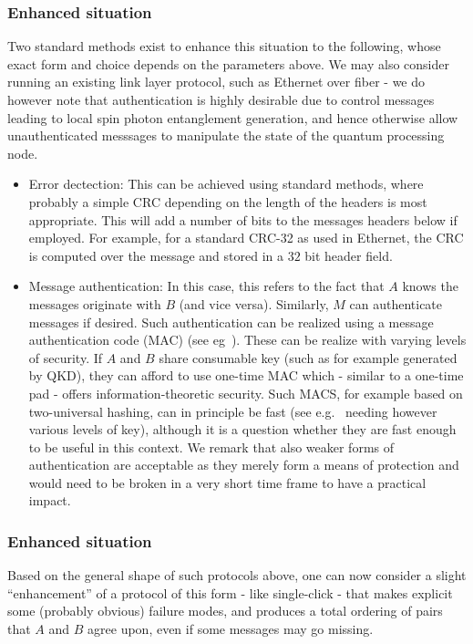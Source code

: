 \documentclass{article}
\begin{document}
\subsubsection{Enhanced situation}
Two standard methods exist to enhance this situation to the following, whose exact form and choice depends on the parameters above. We may also 
consider running an existing link layer protocol, such as Ethernet over fiber - we do however note that authentication is highly desirable due
to control messages leading to local spin photon entanglement generation, and hence otherwise allow unauthenticated messsages to manipulate the 
state of the quantum processing node.
\begin{itemize}
\item Error dectection: This can be achieved using standard methods, where probably a simple CRC depending on the length of the headers is most appropriate. This will add a number of bits to the messages headers below if employed. For example, for a standard CRC-32 as used in Ethernet, the CRC is computed over the message and stored in a $32$ bit header field.
\item Message authentication: In this case, this refers to the fact that $A$ knows the messages originate with $B$ (and vice versa). 
Similarly, $M$ can authenticate messages if desired. Such authentication can be realized using a message authentication code (MAC) (see eg~\cite{UMAC}). These can be realize with varying levels of security. If $A$ and $B$ share consumable key (such as for example generated by QKD), they can afford to use one-time MAC which - similar to a one-time pad - offers information-theoretic security. Such MACS, for example based on two-universal hashing,  can in principle be fast (see e.g.~\cite{UMAC} needing however various levels of key), although it is a question whether they are fast enough to be useful in this context. We remark that also weaker forms of authentication are acceptable as they merely form a means of protection and would need to be broken in a very short time frame to have a practical impact.
\end{itemize}

\subsubsection{Enhanced situation}

Based on the general shape of such protocols above, one can now consider a slight ``enhancement'' of a protocol of this form - like single-click - 
that makes explicit some (probably obvious) failure modes, and produces a total ordering of pairs that $A$ and $B$ agree upon, even if some messages may go missing.
\end{document}
